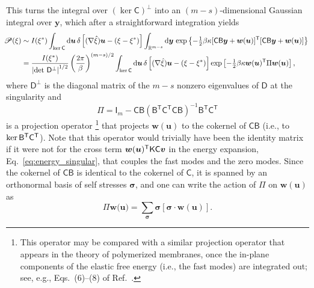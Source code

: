 This turns the integral over $(\ker\mathsf{C})^{\perp}$ into an $(m-s)$-dimensional Gaussian integral over $\bm{y}$, which after a straightforward integration yields
%
\begin{equation}
  \hspace{-0.5em}
  \begin{aligned}
    \mathscr{P}(\xi) &\sim I(\xi^{*}) \int_{\ker\mathsf{C}} \mathrm{d}\bm{u}\, \delta\left[(\nabla\hat{\xi})\bm{u} - (\xi - \xi^{*})\right] \int_{\mathbb{R}^{m-s}} \mathrm{d}\bm{y}\, \exp\left\{-\tfrac{1}{2}\beta\kappa[\mathsf{C}\mathsf{B}\bm{y} + \bm{w}(\bm{u})]^\mathsf{T}[\mathsf{C}\mathsf{B}\bm{y} + \bm{w}(\bm{u})]\right\}\\
                                             &= \frac{I(\xi^{*})}{\left|\det\, \mathsf{D}^\perp\right|^{1/2}} \left(\frac{2\pi}{\beta}\right)^{(m-s)/2} \int_{\ker\mathsf{C}} \mathrm{d}\bm{u}\, \delta\left[(\nabla\hat{\xi})\bm{u} - (\xi - \xi^{*})\right] \exp\left[-\tfrac{1}{2}\beta\kappa \bm{w}(\bm{u})^\mathsf{T}\Pi \bm{w}(\bm{u})\right],
  \end{aligned}
  \label{eq:mpd_gaussian}
\end{equation}
%
where $\mathsf{D}^\perp$ is the diagonal matrix of the $m - s$ nonzero eigenvalues of $\mathsf{D}$ at the singularity and
%
\begin{equation}
  \Pi = \mathsf{I}_{m} - \mathsf{C}\mathsf{B} (\mathsf{B} ^\mathsf{T}\mathsf{C}^\mathsf{T}\mathsf{C}\mathsf{B} )^{-1}\mathsf{B} ^\mathsf{T}\mathsf{C}^\mathsf{T}
\end{equation}
%
is a projection operator%
\footnote{This operator may be compared with a similar projection operator that appears in the theory of polymerized membranes, once the in-plane components of the elastic free energy (i.e., the fast modes) are integrated out; see, e.g., Eqs.~(6)--(8) of Ref.~\cite{nelson1987}.}
that projects $\bm{w}(\bm{u})$ to the cokernel of $\mathsf{C}\mathsf{B}$ (i.e., to $\ker\mathsf{B}^\mathsf{T}\mathsf{C}^\mathsf{T}$).
Note that this operator would trivially have been the identity matrix if it were not for the cross term $\bm{w}(\bm{u})^\mathsf{T}\mathsf{K}\mathsf{C}\bm{v}$ in the energy expansion, Eq.~\eqref{eq:energy_singular}, that couples the fast modes and the zero modes.
Since the cokernel of $\mathsf{CB}$ is identical to the cokernel of $\mathsf{C}$, it is spanned by an orthonormal basis of self stresses $\bm{\sigma}$, and one can write the action of $\Pi$ on $\bm{w}(\bm{u})$ as
%
\begin{equation}
  \Pi \bm{w}(\bm{u)} = \sum_{\bm{\sigma}} \bm{\sigma}[\bm{\sigma}\cdot\bm{w}(\bm{u})].
  \label{eq:mpd_proj}
\end{equation}
